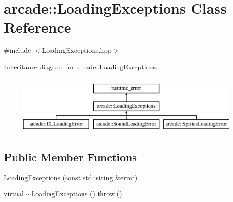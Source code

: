 \hypertarget{classarcade_1_1_loading_exceptions}{\section{arcade\-:\-:Loading\-Exceptions Class Reference}
\label{classarcade_1_1_loading_exceptions}
}


{\ttfamily \#include $<$Loading\-Exceptions.\-hpp$>$}

Inheritance diagram for arcade\-:\-:Loading\-Exceptions\-:\begin{figure}[H]
\begin{center}
\leavevmode
\includegraphics[height=3.000000cm]{classarcade_1_1_loading_exceptions}
\end{center}
\end{figure}
\subsection*{Public Member Functions}
\begin{DoxyCompactItemize}
\item 
\hyperlink{classarcade_1_1_loading_exceptions_a998aad0221a9aaf322ea229d972ed754}{Loading\-Exceptions} (\hyperlink{term__entry_8h_a57bd63ce7f9a353488880e3de6692d5a}{const} std\-::string \&error)
\item 
virtual \hyperlink{classarcade_1_1_loading_exceptions_a8d90d562db326eb41d186285d28b0484}{$\sim$\-Loading\-Exceptions} ()  throw ()
\end{DoxyCompactItemize}


